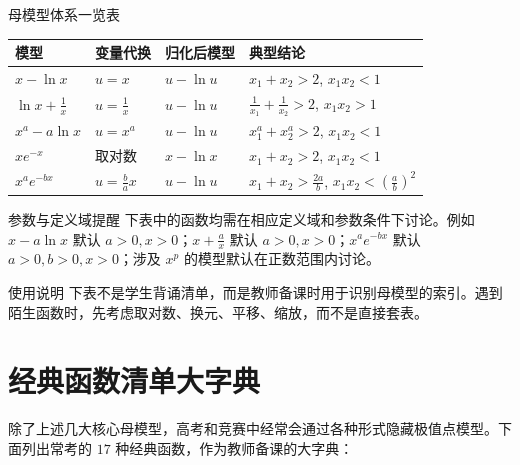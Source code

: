 \documentclass[11pt,a4paper]{ctexart}
\begin{document}
\begin{teachbox}{母模型体系一览表}
\begin{center}
\renewcommand{\arraystretch}{1.4}
\setlength{\tabcolsep}{12pt}
\begin{tabular}{llll}
\toprule
\textbf{模型} & \textbf{变量代换} & \textbf{归化后模型} & \textbf{典型结论}\\
\midrule
$x-\ln x$ & $u=x$ & $u-\ln u$ & $x_1+x_2>2$, $x_1x_2<1$\\
$\ln x+\frac{1}{x}$ & $u=\frac{1}{x}$ & $u-\ln u$ & $\frac{1}{x_1}+\frac{1}{x_2}>2$, $x_1x_2>1$\\
$x^a-a\ln x$ & $u=x^a$ & $u-\ln u$ & $x_1^a+x_2^a>2$, $x_1x_2<1$\\
$xe^{-x}$ & 取对数 & $x-\ln x$ & $x_1+x_2>2$, $x_1x_2<1$\\
$x^ae^{-bx}$ & $u=\frac{b}{a}x$ & $u-\ln u$ & $x_1+x_2>\frac{2a}{b}$, $x_1x_2<\left(\frac{a}{b}\right)^2$\\
\bottomrule
\end{tabular}
\end{center}
\end{teachbox}

\begin{keybox}{参数与定义域提醒}
下表中的函数均需在相应定义域和参数条件下讨论。例如 $x-a\ln x$ 默认 $a>0,x>0$；$x+\frac ax$ 默认 $a>0,x>0$；$x^ae^{-bx}$ 默认 $a>0,b>0,x>0$；涉及 $x^p$ 的模型默认在正数范围内讨论。
\end{keybox}

\begin{keybox}{使用说明}
下表不是学生背诵清单，而是教师备课时用于识别母模型的索引。遇到陌生函数时，先考虑取对数、换元、平移、缩放，而不是直接套表。
\end{keybox}

\section{经典函数清单大字典}

除了上述几大核心母模型，高考和竞赛中经常会通过各种形式隐藏极值点模型。下面列出常考的 $17$ 种经典函数，作为教师备课的大字典：
\end{document}
